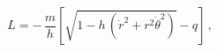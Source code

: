 \begin{equation} \label{grangiano}
L = - \, \frac{m}{h} \left[ \sqrt{1 - h \, (\dot{r}^2 + r^2
\dot{\theta}^2)} - q \right] \, ,
\end{equation}

